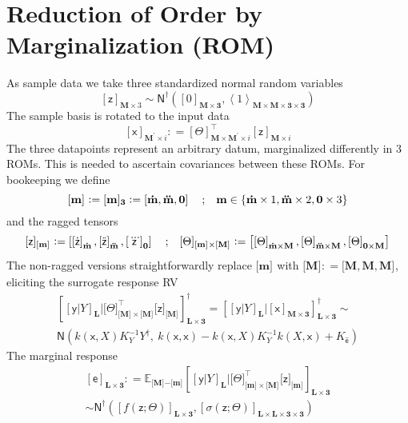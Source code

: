 \documentclass[preprint,12pt]{elsarticle}
\newcommand*{\M}[1]{\ensuremath{#1}\xspace}
\newcommand*{\x}{\times}
\newcommand*{\mi}[1]{\mathbf{#1}}
\newcommand*{\rv}[1]{\mathsf{#1}}
\newcommand*{\te}[2][]{\left\lbrack{#2}\right\rbrack_{#1}}
\newcommand*{\tte}[2][]{\lbrack{#2}\rbrack_{#1}}
\newcommand*{\tse}[2][]{\mi{\lbrack#2\rbrack}_{#1}}
\newcommand*{\tme}[3][]{\lbrack{#3}\rbrack_{\tse[#1]{#2}}}
\newcommand*{\diag}[2][]{\left\langle{#2}\right\rangle_{#1}}
\newcommand*{\deq}{\M{\mathrel{\mathop:}=}}
\newcommand{\T}[1]{\text{#1}}
\newcommand*{\QT}[2][]{\M{\quad\T{#2}\ifthenelse{\equal{#1}{}}{\quad}{#1}}}
\newcommand*{\evt}[3][]{\mathbb{E}_{#3}^{#1}\!#2}
\newcommand*{\gauss}[2]{\mathsf{N}\!\left({#1,#2}\right)}
\newcommand*{\gaussd}[2]{\mathsf{N}^{\dagger}\!\left({#1,#2}\right)}
\newcommand*{\set}[1]{\M{\left\lbrace{#1}\right\rbrace}}
\begin{document}
\section{Reduction of Order by Marginalization (ROM)} \label{sec:ROM}
    As sample data we take three standardized normal random variables
    \begin{equation} \label{def:ROM:zDist}
        \te[\mi{M}\x 3]{\rv{z}} \sim \gaussd{\te[\mi{M\x 3}]{0}}{\diag[\mi{M\x M\x 3\x 3}]{1}}
    \end{equation}
    The sample basis is rotated to the input data
    \begin{equation} \label{def:ROM:rotation}
        \te[\mi{M^{\prime}}\x i]{\rv{x}} \deq \te[\mi{M\x M^{\prime}}\x i]{\Theta}^{\intercal} \te[\mi{M}\x i]{\rv{z}}
    \end{equation}
    The three datapoints represent an arbitrary datum, marginalized differently in 3 ROMs. This is needed to ascertain covariances between these ROMs. For bookeeping we define
    \begin{equation*}
        \tte[]{\mi{m}} \deq \tte[\mi{3}]{\mi{m}} \deq \te{\mi{\dot{m}},\mi{\ddot{m}},\mi{0}} \QT{;} 
        \mi{m} \in \set{\mi{\dot{m}}\x 1,\mi{\ddot{m}}\x 2,\mi{0}\x 3}
    \end{equation*}
    and the ragged tensors
    \begin{equation*}
            \tme{m}{\rv{z}} \deq
            \te{\te[\mi{\dot{m}}]{\rv{\dot{z}}} , \te[\mi{\ddot{m}}]{\rv{\ddot{z}}} , \te[\mi{0}]{\rv{\dddot{z}}}} \QT{;}
            \tte[\tse{m}\x\tse{M}]{\Theta} \deq
            \te{\te[\mi{\dot{m}\x M}]{\Theta} , \te[\mi{\ddot{m}\x M}]{\Theta} , \te[\mi{0\x M}]{\Theta}}
    \end{equation*}
    The non-ragged versions straightforwardly replace $\tte{\mi{m}}$ with $\tte{\mi{M}}\deq \tte{\mi{M},\mi{M},\mi{M}}$, eliciting the surrogate response RV
    \begin{multline} \label{def:ROM:predictive}
        \te[\mi{L\x 3}]{\te[\mi{L}]{\rv{y} \vert Y} \big\vert \tte[\tse{M}\x\tse{M}]{\Theta}^{\intercal} \tme{M}{\rv{z}}}^{\dagger} =
        \te[\mi{L\x 3}]{\te[\mi{L}]{\rv{y} \vert Y} \big\vert \te[\mi{M\x 3}]{\rv{x}}}^{\dagger} \sim \\
        \gauss{k(\rv{x},X) K_{Y}^{-1} Y^{\dagger}}{\ k(\rv{x},\rv{x}) - k(\rv{x},X) K_{Y}^{-1} k(X,\rv{x}) + {K_{\rv{\hat{e}}}}}
    \end{multline}
    The marginal response
    \begin{multline} \label{def:ROM:marginal}
        \te[\mi{L\x \mi{3}}]{\rv{e}} \deq \evt{\te[\mi{L\x 3}]{\te[\mi{L}]{\rv{y} \vert Y}
        \big\vert \tte[\tse{m}\x\tse{M}]{\Theta}^{\intercal} \tme{m}{\rv{z}}}}{\tse{M}\mi{-}\tse{m}} \\
        \sim \gaussd{\te[\mi{L\x 3}]{f(\rv{z}; \Theta)}}
        {\te[\mi{L\x L\x 3\x 3}]{\sigma(\rv{z}; \Theta)}}
    \end{multline}
\end{document}
